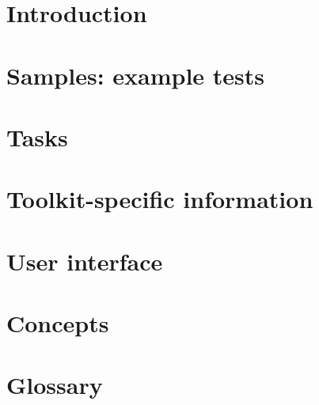 



\tableofcontents
\renewcommand{\bxcomment}[2]{}%
\clearpage
\chapter{Introduction}
\label{Introduction}


\clearpage
\chapter{Samples: example tests}
\label{Samples}


\clearpage
 \chapter{Tasks}
 \label{Tasks}


\clearpage
\chapter{Toolkit-specific information}
\label{Toolkit}


\clearpage
\chapter{User interface}
\label{ChapterUserInterface}


\clearpage
\chapter{Concepts}
\label{Concepts}


\clearpage
\chapter{Glossary}
\label{Glossary}


\clearpage
\printindex
